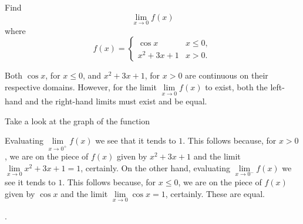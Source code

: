 \documentclass{ximera}
\begin{document}
\begin{question}
  Find 
  \[
  \displaystyle \lim_{x\to 0} f(x)
  \]
  where
  \[
  f(x) = \left\{\begin{array}{cl} \cos x & x\leq 0, \\ x^2+3x+1 & x>0. \end{array}\right.
  \]
  \begin{solution}
    \begin{hint}
     Both $\cos x$, for $x\leq0$, and $x^2+3x+1$, for $x>0$ are continuous on their respective domains. However, for the limit $\lim\limits_{x\to0}f(x)$ to exist, both the left-hand and the right-hand limits must exist and be equal.
    \end{hint}
     \begin{hint}
    	Take a look at the graph of the function
    \begin{center}
      \end{center} 
    \end{hint}
    \begin{hint}
     Evaluating $\lim\limits_{x\to0^{+}}f(x)$ we see that it tends to $1$. This follows because, for $x>0$, we are on the piece of $f(x)$ given by $x^2+3x+1$ and the limit $\lim\limits_{x\to0}x^2+3x+1=1$, certainly. On the other hand, evaluating $\lim\limits_{x\to0^{-}}f(x)$ we see it tends to $1$. This follows because, for $x\leq0$, we are on the piece of $f(x)$ given by $\cos x$ and the limit $\lim\limits_{x\to0}\cos x=1$, certainly. These are equal.
    \end{hint}
    .
  \end{solution}
\end{question}
\end{document}
